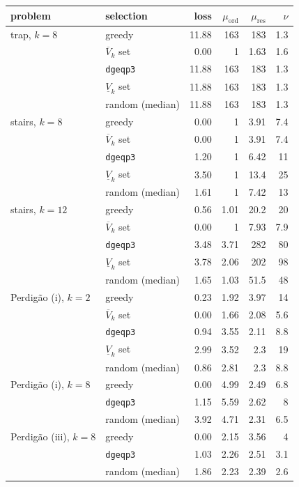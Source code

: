 \begin{tabular}{@{}l l r r r r@{}}
\toprule
problem & selection & loss & $\mu_{\mathrm{ord}}$ & $\mu_{\mathrm{res}}$ & $\nu$\\
\midrule
trap, $k=8$ & greedy & 11.88 & 163 & 183 & 1.3\\
 & $\overline V_k$ set & 0.00 & 1 & 1.63 & 1.6\\
 & \texttt{dgeqp3} & 11.88 & 163 & 183 & 1.3\\
 & $\underline V_k$ set & 11.88 & 163 & 183 & 1.3\\
 & random (median) & 11.88 & 163 & 183 & 1.3\\
\addlinespace[2pt]
stairs, $k=8$ & greedy & 0.00 & 1 & 3.91 & 7.4\\
 & $\overline V_k$ set & 0.00 & 1 & 3.91 & 7.4\\
 & \texttt{dgeqp3} & 1.20 & 1 & 6.42 & 11\\
 & $\underline V_k$ set & 3.50 & 1 & 13.4 & 25\\
 & random (median) & 1.61 & 1 & 7.42 & 13\\
\addlinespace[2pt]
stairs, $k=12$ & greedy & 0.56 & 1.01 & 20.2 & 20\\
 & $\overline V_k$ set & 0.00 & 1 & 7.93 & 7.9\\
 & \texttt{dgeqp3} & 3.48 & 3.71 & 282 & 80\\
 & $\underline V_k$ set & 3.78 & 2.06 & 202 & 98\\
 & random (median) & 1.65 & 1.03 & 51.5 & 48\\
\addlinespace[2pt]
Perdig\~ao (i), $k=2$ & greedy & 0.23 & 1.92 & 3.97 & 14\\
 & $\overline V_k$ set & 0.00 & 1.66 & 2.08 & 5.6\\
 & \texttt{dgeqp3} & 0.94 & 3.55 & 2.11 & 8.8\\
 & $\underline V_k$ set & 2.99 & 3.52 & 2.3 & 19\\
 & random (median) & 0.86 & 2.81 & 2.3 & 8.8\\
\addlinespace[2pt]
Perdig\~ao (i), $k=8$ & greedy & 0.00 & 4.99 & 2.49 & 6.8\\
 & \texttt{dgeqp3} & 1.15 & 5.59 & 2.62 & 8\\
 & random (median) & 3.92 & 4.71 & 2.31 & 6.5\\
\addlinespace[2pt]
Perdig\~ao (iii), $k=8$ & greedy & 0.00 & 2.15 & 3.56 & 4\\
 & \texttt{dgeqp3} & 1.03 & 2.26 & 2.51 & 3.1\\
 & random (median) & 1.86 & 2.23 & 2.39 & 2.6\\
\bottomrule
\end{tabular}

